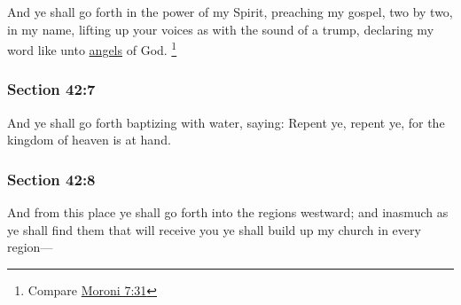 		And ye shall go forth in the power of my Spirit, preaching my gospel, two by two, in my name, lifting up your voices as with the sound of a trump, declaring my word like unto \hyperref[ANGEL]{angels} of God.%
			\footnote{%
				Compare \hyperref[MORONI-7-31]{Moroni 7:31}
				}


	\subsubsection{Section 42:7} %
		\label{DC42-7}

		And ye shall go forth baptizing with water, saying: Repent ye, repent ye, for the kingdom of heaven is at hand.


	\subsubsection{Section 42:8} %
		\label{DC42-8}

		And from this place ye shall go forth into the regions westward; and inasmuch as ye shall find them that will receive you ye shall build up my church in every region---


